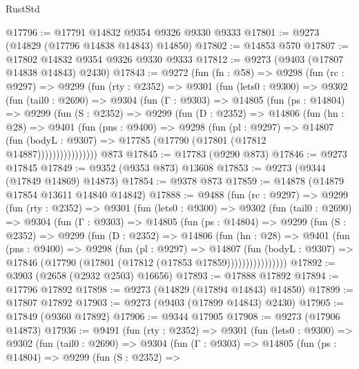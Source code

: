 \begin{lexlean}{RustStd}
\begin{coremodule}
@17796 := @17791 @14832 @9354 @9326 @9330 @9333
@17801 := @9273 (@14829 (@17796 @14838 @14843) @14850)
@17802 := @14853 @570
@17807 := @17802 @14832 @9354 @9326 @9330 @9333
@17812 := @9273 (@9403 (@17807 @14838 @14843) @2430)
@17843 := @9272
    (fun (fn : @58) =>
    @9298
      (fun (rc : @9297) =>
      @9299
        (fun (rty : @2352) =>
        @9301
          (fun (lets0 : @9300) =>
          @9302
            (fun (tail0 : @2690) =>
            @9304
              (fun (Γ : @9303) =>
              @14805
                (fun (ps : @14804) =>
                @9299
                  (fun (S : @2352) =>
                  @9299
                    (fun (D : @2352) =>
                    @14806
                      (fun (hn : @28) =>
                      @9401
                        (fun (pns : @9400) =>
                        @9298
                          (fun (pl : @9297) =>
                          @14807
                            (fun (bodyL : @9307) =>
                            @17785 (@17790 (@17801 (@17812 @14887))))))))))))))))
    @873
@17845 := @17783 (@9290 @873)
@17846 := @9273 @17845
@17849 := @9352 (@9353 @873) @13608
@17853 := @9273 (@9344 (@17849 @14869) @14873)
@17854 := @9378 @873
@17859 := @14878 (@14879 @17854 @13611 @14840 @14842)
@17888 := @9488
    (fun (rc : @9297) =>
    @9299
      (fun (rty : @2352) =>
      @9301
        (fun (lets0 : @9300) =>
        @9302
          (fun (tail0 : @2690) =>
          @9304
            (fun (Γ : @9303) =>
            @14805
              (fun (ps : @14804) =>
              @9299
                (fun (S : @2352) =>
                @9299
                  (fun (D : @2352) =>
                  @14806
                    (fun (hn : @28) =>
                    @9401
                      (fun (pns : @9400) =>
                      @9298
                        (fun (pl : @9297) =>
                        @14807
                          (fun (bodyL : @9307) =>
                          @17846 (@17790 (@17801 (@17812 (@17853 @17859))))))))))))))))
@17892 := @3903 (@2658 (@2932 @2503) @16656)
@17893 := @17888 @17892
@17894 := @17796 @17892
@17898 := @9273 (@14829 (@17894 @14843) @14850)
@17899 := @17807 @17892
@17903 := @9273 (@9403 (@17899 @14843) @2430)
@17905 := @17849 (@9360 @17892)
@17906 := @9344 @17905
@17908 := @9273 (@17906 @14873)
@17936 := @9491
    (fun (rty : @2352) =>
    @9301
      (fun (lets0 : @9300) =>
      @9302
        (fun (tail0 : @2690) =>
        @9304
          (fun (Γ : @9303) =>
          @14805
            (fun (ps : @14804) =>
            @9299
              (fun (S : @2352) =>

\end{coremodule}
\end{lexlean}
